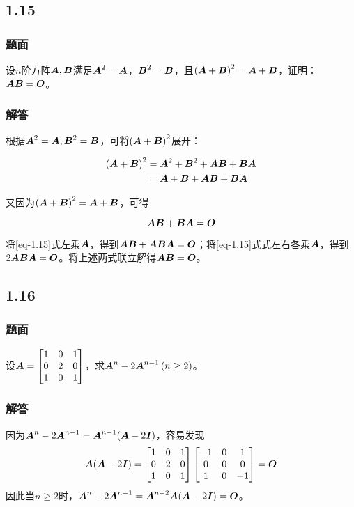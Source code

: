 \documentclass[9pt,xcolor=svgnames]{beamer} %
\begin{document}
\subsection*{1.15}
\begin{frame}
    \frametitle{题面}
    设\(n\)阶方阵\(\boldsymbol{A},\boldsymbol{B}\)满足\(\boldsymbol{A}^2=\boldsymbol{A}\)，\(\boldsymbol{B}^2=\boldsymbol{B}\)，且\(\left( \boldsymbol{A}+\boldsymbol{B} \right)^2=\boldsymbol{A}+\boldsymbol{B}\)，证明：\(\boldsymbol{A}\boldsymbol{B}=\boldsymbol{O}\)。
\end{frame}
\begin{frame}
    \frametitle{解答}
    根据\(\boldsymbol{A}^2=\boldsymbol{A},\boldsymbol{B}^2=\boldsymbol{B}\)，可将\(\left( \boldsymbol{A}+\boldsymbol{B} \right)^2\)展开：

    \begin{align*}
        \left( \boldsymbol{A}+\boldsymbol{B} \right)^2 & =\boldsymbol{A}^2+\boldsymbol{B}^2+\boldsymbol{A}\boldsymbol{B}+\boldsymbol{B}\boldsymbol{A} \\
                             & =\boldsymbol{A}+\boldsymbol{B}+\boldsymbol{A}\boldsymbol{B}+\boldsymbol{B}\boldsymbol{A}
    \end{align*}

    又因为\(\left( \boldsymbol{A}+\boldsymbol{B} \right)^2=\boldsymbol{A}+\boldsymbol{B}\)，可得

    \begin{equation}\label{eq-1.15}
        \boldsymbol{A}\boldsymbol{B}+\boldsymbol{B}\boldsymbol{A}=\boldsymbol{O}
    \end{equation}

    将\eqref{eq-1.15}式左乘\(\boldsymbol{A}\)，得到\(\boldsymbol{A}\boldsymbol{B}+\boldsymbol{A}\boldsymbol{B}\boldsymbol{A}=\boldsymbol{O}\)；将\eqref{eq-1.15}式式左右各乘\(\boldsymbol{A}\)，得到\(2\boldsymbol{A}\boldsymbol{B}\boldsymbol{A}=\boldsymbol{O}\)。将上述两式联立解得\(\boldsymbol{A}\boldsymbol{B}=\boldsymbol{O}\)。
\end{frame}

\subsection*{1.16}
\begin{frame}
    \frametitle{题面}
    设\(\boldsymbol{A}=\begin{bmatrix}1&0&1\\0&2&0\\1&0&1\end{bmatrix}\)，求\(\boldsymbol{A}^n-2\boldsymbol{A}^{n-1}\left( n\ge2 \right)\)。
\end{frame}
\begin{frame}
    \frametitle{解答}
    因为\(\boldsymbol{A}^n-2\boldsymbol{A}^{n-1}=\boldsymbol{A}^{n-1}(\boldsymbol{A}-2\boldsymbol{I})\)，容易发现
    \begin{equation*}
        \boldsymbol{A}(\boldsymbol{A}-2\boldsymbol{I})=
        \begin{bmatrix}
            1 & 0 & 1 \\0&2&0\\1&0&1
        \end{bmatrix}
        \begin{bmatrix}
            -1 & 0 & 1 \\0&0&0\\1&0&-1
        \end{bmatrix}=\boldsymbol{O}
    \end{equation*}
    因此当\(n\ge2\)时，\(\boldsymbol{A}^n-2\boldsymbol{A}^{n-1}=\boldsymbol{A}^{n-2}\boldsymbol{A}(\boldsymbol{A}-2\boldsymbol{I})=\boldsymbol{O}\)。
\end{frame}
\end{document}

